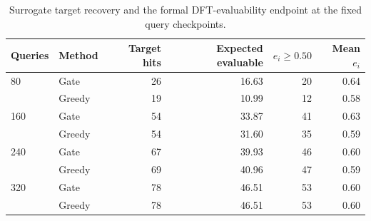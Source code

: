 \begin{table}[!htbp]
\centering
\caption{Surrogate target recovery and the formal DFT-evaluability endpoint at the
fixed query checkpoints.}
\label{tab:evaluability-yield}
\scriptsize
\begin{tabular}{llrrrr}
\toprule
Queries & Method & Target hits & Expected evaluable & $e_i\geq0.50$ & Mean $e_i$ \\
\midrule
80  & Gate   & 26 & 16.63 & 20 & 0.64 \\
    & Greedy & 19 & 10.99 & 12 & 0.58 \\
160 & Gate   & 54 & 33.87 & 41 & 0.63 \\
    & Greedy & 54 & 31.60 & 35 & 0.59 \\
240 & Gate   & 67 & 39.93 & 46 & 0.60 \\
    & Greedy & 69 & 40.96 & 47 & 0.59 \\
320 & Gate   & 78 & 46.51 & 53 & 0.60 \\
    & Greedy & 78 & 46.51 & 53 & 0.60 \\
\bottomrule
\end{tabular}
\end{table}
